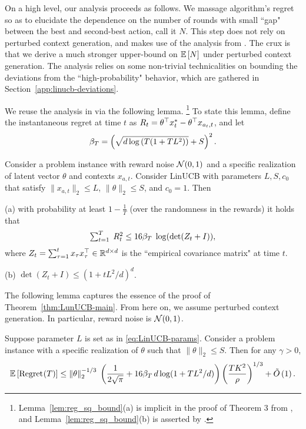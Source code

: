 On a high level, our analysis proceeds as follows. We massage algorithm's regret so as to elucidate the dependence on the number of rounds with small ``gap" between the best and second-best action, call it $N$. This step does not rely on perturbed context generation, and makes use of the analysis from \citet{abbasi2011improved}. The crux is that we derive a much stronger upper-bound on $\mathbb{E}\left[N\right]$ under perturbed context generation. The analysis relies on some non-trivial technicalities on bounding the deviations from the ``high-probability" behavior, which are gathered in Section~\ref{app:linucb-deviations}.

We reuse the analysis in \citet{abbasi2011improved} via the following lemma.%
\footnote{Lemma~\ref{lem:reg_sq_bound}(a) is implicit in the proof of Theorem 3 from \citet{abbasi2011improved}, and Lemma~\ref{lem:reg_sq_bound}(b) is asserted by \citet[][Lemma 10]{abbasi2011improved}.}
 To state this lemma,
define the instantaneous regret at time $t$ as
    $R_{t} = \theta^{\top} x_t^* - \theta^{\top} x_{a_t, t} $,
and let
\[
   \beta_T = \left(\sqrt{d \log \left(T(1 + TL^2)\right)} + S\right)^2.
  \]

\begin{lemma}
Consider a problem instance with reward noise $\mathcal{N}(0, 1)$ and a specific realization of latent vector $\theta$ and contexts $x_{a,t}$. Consider LinUCB with parameters $L,S,c_0$ that satisfy $\|x_{a,t}\|_2\leq L$, $\|\theta\|_2 \le S$, and $c_0= 1$. Then
\begin{OneLiners}
\item[(a)] with probability at least $1-\tfrac{1}{T}$ (over the randomness in the rewards) it holds that
  \[
    \textstyle  \sum_{t=1}^T\; R_{t}^2 \le 16 \beta_T\; \log(\det(Z_t + I)),
  \]
  where $Z_t =\sum_{\tau=1}^t x_\tau x_\tau^{\top}\in \mathbb{R}^{d\times d}$ is the ``empirical covariance matrix" at time $t$.
\item[(b)] $\det(Z_t+I) \le (1 +tL^2/d)^d$.
\end{OneLiners}
  \label{lem:reg_sq_bound}
\end{lemma}

The following lemma captures the essence of the proof of Theorem~\ref{thm:LunUCB-main}. From here on, we assume perturbed context generation. In particular, reward noise is $\mathcal{N}(0, 1)$.

\begin{lemma}
Suppose parameter $L$ is set as in \eqref{eq:LinUCB-params}. Consider a problem instance with a specific realization of $\theta$ such that $\|\theta\|_2 \le S$.
Then for any $\gamma > 0$,
  \begin{align*}
    \mathbb{E}\left[\text{Regret}^{}(T)\right] \le \|\theta\|_2^{-1/3}\;\left(\frac{1}{2\sqrt{\pi}} + 16 \beta_T\, d
    \log(1 + TL^2/d)\right) \left(\frac{TK^2}{\rho}\right)^{1/3} + \tilde
    O\left(1\right).
  \end{align*}
  \label{lem:smooth_oful_step}
\end{lemma}

